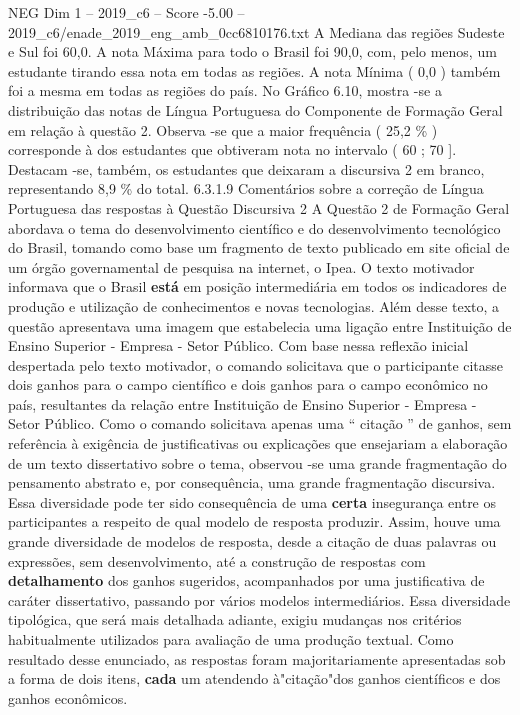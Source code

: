 \begin{textsample}{NEG Dim 1 – 2019\_c6 – Score -5.00 – 2019\_c6/enade\_2019\_eng\_amb\_0cc6810176.txt}
A Mediana das regiões Sudeste e Sul foi 60,0.
A nota Máxima para todo o Brasil foi 90,0, com, pelo menos, um estudante tirando essa nota em todas as regiões.
A nota Mínima ( 0,0 ) também foi a mesma em todas as regiões do país.
No Gráfico 6.10, mostra -se a distribuição das notas de Língua Portuguesa do Componente de Formação Geral em relação à questão 2.
Observa -se que a maior frequência ( 25,2 \% ) corresponde à dos estudantes que obtiveram nota no intervalo ( 60 ; 70 ].
Destacam -se, também, os estudantes que deixaram a discursiva 2 em branco, representando 8,9 \% do total. 6.3.1.9 Comentários sobre a correção de Língua Portuguesa das respostas à Questão Discursiva 2 A Questão 2 de Formação Geral abordava o tema do desenvolvimento científico e do desenvolvimento tecnológico do Brasil, tomando como base um fragmento de texto publicado em site oficial de um órgão governamental de pesquisa na internet, o Ipea.
O texto motivador informava que o Brasil \textbf{está} em posição intermediária em todos os indicadores de produção e utilização de conhecimentos e novas tecnologias.
Além desse texto, a questão apresentava uma imagem que estabelecia uma ligação entre Instituição de Ensino Superior - Empresa - Setor Público.
Com base nessa reflexão inicial despertada pelo texto motivador, o comando solicitava que o participante citasse dois ganhos para o campo científico e dois ganhos para o campo econômico no país, resultantes da relação entre Instituição de Ensino Superior - Empresa - Setor Público.
Como o comando solicitava apenas uma “ citação ” de ganhos, sem referência à exigência de justificativas ou explicações que ensejariam a elaboração de um texto dissertativo sobre o tema, observou -se uma grande fragmentação do pensamento abstrato e, por consequência, uma grande fragmentação discursiva.
Essa diversidade pode ter sido consequência de uma \textbf{certa} insegurança entre os participantes a respeito de qual modelo de resposta produzir.
Assim, houve uma grande diversidade de modelos de resposta, desde a citação de duas palavras ou expressões, sem desenvolvimento, até a construção de respostas com \textbf{detalhamento} dos ganhos sugeridos, acompanhados por uma justificativa de caráter dissertativo, passando por vários modelos intermediários.
Essa diversidade tipológica, que será mais detalhada adiante, exigiu mudanças nos critérios habitualmente utilizados para avaliação de uma produção textual.
Como resultado desse enunciado, as respostas foram majoritariamente apresentadas sob a forma de dois itens, \textbf{cada} um atendendo à"citação"dos ganhos científicos e dos ganhos econômicos.

\end{textsample}
